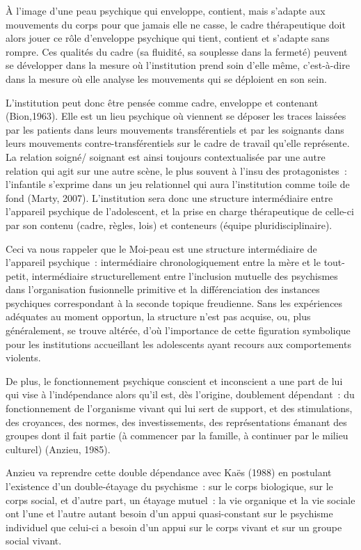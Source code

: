 \documentclass[12pt, a4paper]{book}
\begin{document}
\begin{spacing}{1.5}
À l'image d'une peau psychique qui enveloppe, contient, mais s'adapte aux mouvements du corps pour que jamais elle ne casse, le cadre thérapeutique doit alors jouer ce rôle d'enveloppe psychique qui tient, contient et s'adapte sans rompre. Ces qualités du cadre (sa fluidité, sa souplesse dans la fermeté) peuvent se développer dans la mesure où l'institution prend soin d'elle même, c'est-à-dire dans la mesure où elle analyse les mouvements qui se déploient en son sein. 

L'institution peut donc être pensée comme cadre, enveloppe et contenant (Bion,1963). Elle est un lieu psychique où viennent se déposer les traces laissées par les patients dans leurs mouvements transférentiels et par les soignants dans leurs mouvements contre-transférentiels sur le cadre de travail qu'elle représente. La relation soigné/ soignant est ainsi toujours contextualisée par une autre relation qui agit sur une autre scène, le plus souvent à l'insu des protagonistes : l'infantile s'exprime dans un jeu relationnel qui aura l'institution comme toile de fond (Marty, 2007). L'institution sera donc une structure intermédiaire entre l'appareil psychique de l'adolescent, et la prise en charge thérapeutique de celle-ci par son contenu (cadre, règles, lois) et conteneurs (équipe pluridisciplinaire).

Ceci va nous rappeler que le Moi-peau est une structure intermédiaire de l'appareil psychique : intermédiaire chronologiquement entre la mère et le tout-petit, intermédiaire structurellement entre l'inclusion mutuelle des psychismes dans l'organisation fusionnelle primitive et la différenciation des instances psychiques correspondant à la seconde topique freudienne. Sans les expériences adéquates au moment opportun, la structure n'est pas acquise, ou, plus généralement, se trouve altérée, d'où l'importance de cette figuration symbolique pour les institutions accueillant les adolescents ayant recours aux comportements violents.

De plus, le fonctionnement psychique conscient et inconscient a une part de lui qui vise à l'indépendance alors qu'il est, dès l'origine, doublement dépendant : du fonctionnement de l'organisme vivant qui lui sert de support, et des stimulations, des croyances, des normes, des investissements, des représentations émanant des groupes dont il fait partie (à commencer par la famille, à continuer par le milieu culturel) (Anzieu, 1985).

Anzieu va reprendre cette double dépendance avec Kaës (1988) en postulant l'existence d'un double-étayage du psychisme : sur le corps biologique, sur le corps social, et d'autre part, un étayage mutuel : la vie organique et la vie sociale ont l'une et l'autre autant besoin d'un appui quasi-constant sur le psychisme individuel que celui-ci a besoin d'un appui sur le corps vivant et sur un groupe social vivant.


\end{spacing}
\end{document}
